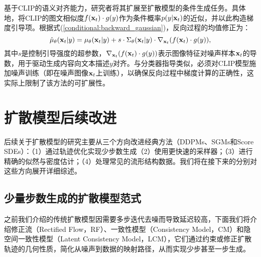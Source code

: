 \documentclass[11pt,a4paper,UTF8]{ctexart}
\begin{document}
基于CLIP的语义对齐能力，研究者将其扩展至扩散模型的条件生成任务\cite{clip-guide-1,Patashnik_2021_ICCV,gal2022StyleGAN}。具体地，将CLIP的图文相似度$f(\mathbf{x}_t)\cdot g(y)$作为条件概率$p(y|\mathbf{x}_t)$的近似，并以此构造梯度引导项。根据式(\ref{conditional:backward_gaussian})，反向过程的均值修正为：
\begin{equation}
\hat{\mu}_{\theta}(\mathbf{x}_t|y)=\mu_{\theta}(\mathbf{x}_t|y) + s\cdot\Sigma_\theta(\mathbf{x}_t|y)\cdot\nabla_{\mathbf{x}_t}(f(\mathbf{x}_t)\cdot g(y)),
\label{conditional_clip_guided}
\end{equation}
其中$s$是控制引导强度的超参数，$\nabla_{\mathbf{x}_t}(f(\mathbf{x}_t)\cdot g(y))$表示图像特征对噪声样本$\mathbf{x}_t$的导数，用于驱动生成内容向文本描述$y$对齐。与分类器指导类似，必须对CLIP模型施加噪声训练（即在噪声图像$\mathbf{x}_t$上训练），以确保反向过程中梯度计算的正确性，这实际上限制了该方法的可扩展性。


\section{扩散模型后续改进}

后续关于扩散模型的研究主要从三个方向改进经典方法（DDPMs、SGMs和Score SDEs）：（1）通过轨迹优化实现少步数生成（2）使用更快速的采样器；（3）进行精确的似然与密度估计；（4）处理常见的流形结构数据。我们将在接下来的分别对这些方向展开详细综述。

\subsection{少量步数生成的扩散模型范式}

之前我们介绍的传统扩散模型因需要多步迭代去噪而导致延迟较高，下面我们将介绍修正流（Rectified Flow，RF）\cite{liu2022flow}、一致性模型（Consistency Model，CM）\cite{pmlr-v202-song23a}和隐空间一致性模型（Latent Consistency Model，LCM）\cite{luo2023latent}，它们通过约束或修正扩散轨迹的几何性质，简化从噪声到数据的映射路径，从而实现少步甚至一步生成。
\end{document}
